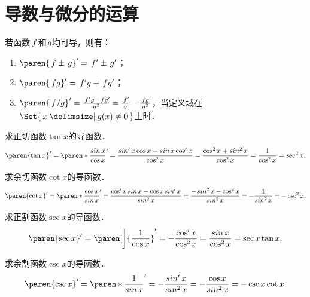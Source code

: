 \section{导数与微分的运算}

\begin{theorem*}
  \label{thm:deriv4ops}
  若函数\(\,f\mkern2mu\)和\(\mkern1mu g\)均可导，则有：
  \begin{enumerate}
    \renewcommand{\labelenumi}{\enumparen{\arabic{enumi}}}
  \item \(\paren{\,f \pm \,g}' = \,f' \pm \,g'\)；
  \item \(\paren{\,fg}' = \,f'g + \,fg'\)；
  \item \(\paren{\,f/g}' = \frac{\,f'g - \,fg'\!}{g^2} = \frac{\,f'\!}{g} - \frac{\,fg'\!}{g^2}\)，当定义域在\(\Set{\,x \mid g(x) \ne 0\,}\)上时．
  \end{enumerate}
\end{theorem*}

\begin{example*}
  求正切函数\(\tan x\)的导函数．
  \begin{equation*}
    \paren{\tan x}'
    = \paren*{\frac{\sin x}{\cos x}}'
    = \frac{\sin' x \cos x - \sin x \cos' x}{\cos^2 x}
    = \frac{\cos^2 x + \sin^2 x}{\cos^2 x}
    = \frac{1}{\cos^2 x}
    = \sec^2 x.
  \end{equation*}
\end{example*}

\begin{example*}
  求余切函数\(\cot x\)的导函数．
  \begin{equation*}
    \paren{\cot x}'
    = \paren*{\frac{\cos x}{\sin x}}'
    = \frac{\cos' x \sin x - \cos x \sin' x}{\sin^2 x}
    = \frac{-\sin^2 x - \cos^2 x}{\sin^2 x}
    = -\frac{1}{\sin^2 x}
    = -\csc^2 x.
  \end{equation*}
\end{example*}

\begin{example*}
  求正割函数\(\sec x\)的导函数．
  \begin{equation*}
    \paren{\sec x}'
    = \paren[\bigg]{\frac{1}{\cos x}}'
    = -\frac{\cos' x}{\cos^2 x}
    = \frac{\sin x}{\cos^2 x}
    = \sec x \tan x.
  \end{equation*}
\end{example*}

\begin{example*}
  求余割函数\(\csc x\)的导函数．
  \begin{equation*}
    \paren{\csc x}'
    = \paren*{\frac{1}{\sin x}}'
    = -\frac{\sin' x}{\sin^2 x}
    = -\frac{\cos x}{\sin^2 x}
    = -\csc x \cot x.
  \end{equation*}
\end{example*}

